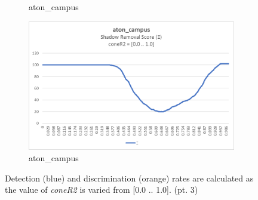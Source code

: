 \begin{appendices}
\begin{figure}
\begin{subfigure}{.45\linewidth}
  \caption{aton\_campus}
\end{subfigure}
\hfill
\begin{subfigure}{.45\linewidth}
  \includegraphics[width=1\linewidth]{figures/appendix/campus_coneR2_score.jpg}
  \caption{aton\_campus}
\end{subfigure}

\caption{Detection (blue) and discrimination (orange) rates are calculated as the value of \textit{coneR2} is varied from [0.0 .. 1.0]. (pt. 3)}
\end{figure}


\end{appendices}
